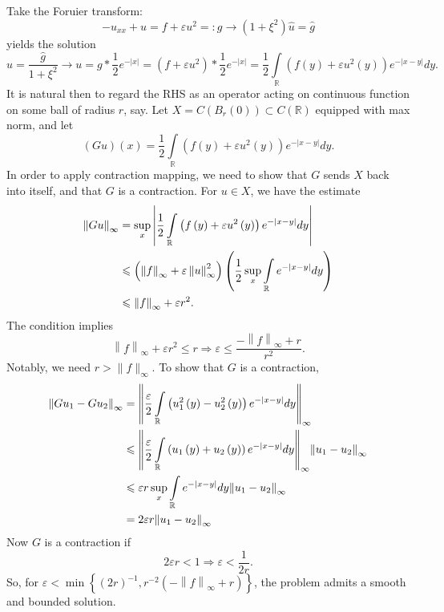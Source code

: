 \documentclass[letterpaper,twoside,11pt]{article}
\theoremstyle{mystyle}
\newcommand{\cblu}{\color{blue}}
\newcommand{\inv}{^{-1}}
\begin{document}
\cblu 
Take the Foruier transform: 
\[ - {u_{xx}} + u = f + \varepsilon {u^2} = :g \longrightarrow \left( {1 + {\xi ^2}} \right)\hat u = \hat g\]
yields the solution 
\[\hat u = \frac{{\hat g}}{{1 + {\xi ^2}}} \longrightarrow u = g * \frac{1}{2}{e^{ - \left| x \right|}} = \left( {f + \varepsilon {u^2}} \right) * \frac{1}{2}{e^{ - \left| x \right|}} = \frac{1}{2}\int\limits_\mathbb{R} {\left( {f\left( y \right) + \varepsilon {u^2}\left( y \right)} \right){e^{ - \left| {x - y} \right|}}dy} .\]
It is natural then to regard the RHS as an operator acting on continuous function on some ball of radius $r$, say. 
Let $X = C\left( {{B_r}\left( 0 \right)} \right) \subset C\left( \mathbb{R} \right)$ equipped with max norm, and let 
\[\left( {Gu} \right)\left( x \right) = \frac{1}{2}\int\limits_\mathbb{R} {\left( {f\left( y \right) + \varepsilon {u^2}\left( y \right)} \right){e^{ - \left| {x - y} \right|}}dy} .\]
In order to apply contraction mapping, we need to show that $G$ sends $X$ back into itself, and that $G$ is a contraction. For $u \in X$, we have the estimate 
\begin{align*}
    {\left\| {Gu} \right\|_\infty } &= \mathop {\sup }\limits_x \left| {\frac{1}{2}\int\limits_\mathbb{R} {\left( {f\left( y \right) + \varepsilon {u^2}\left( y \right)} \right){e^{ - \left| {x - y} \right|}}dy} } \right| \hfill \\
     &\leqslant \left( {{{\left\| f \right\|}_\infty } + \varepsilon \left\| u \right\|_\infty ^2} \right)\left( {\frac{1}{2}\mathop {\sup }\limits_x \int\limits_\mathbb{R} {{e^{ - \left| {x - y} \right|}}dy} } \right) \hfill \\
     &\leqslant {\left\| f \right\|_\infty } + \varepsilon {r^2}.
\end{align*}
The condition implies 
\[{\left\| f \right\|_\infty } + \varepsilon {r^2} \leqslant r \Rightarrow \varepsilon  \leqslant \frac{{ - {{\left\| f \right\|}_\infty } + r}}{{{r^2}}}.\]
Notably, we need $r > \|f\|_{\infty}$. 
To show that $G$ is a contraction, 
\begin{align*}
    {\left\| {G{u_1} - G{u_2}} \right\|_\infty } &= {\left\| {\frac{\varepsilon }{2}\int\limits_\mathbb{R} {\left( {u_1^2\left( y \right) - u_2^2\left( y \right)} \right){e^{ - \left| {x - y} \right|}}dy} } \right\|_\infty } \hfill \\
     &\leqslant {\left\| {\frac{\varepsilon }{2}\int\limits_\mathbb{R} {\left( {{u_1}\left( y \right) + {u_2}\left( y \right)} \right){e^{ - \left| {x - y} \right|}}dy} } \right\|_\infty }{\left\| {{u_1} - {u_2}} \right\|_\infty } \hfill \\
     &\leqslant \varepsilon r\mathop {\sup }\limits_x \int\limits_\mathbb{R} {{e^{ - \left| {x - y} \right|}}dy} {\left\| {{u_1} - {u_2}} \right\|_\infty } \hfill \\
     &= 2\varepsilon r{\left\| {{u_1} - {u_2}} \right\|_\infty } 
\end{align*}
Now $G$ is a contraction if 
\[2\varepsilon r < 1 \Rightarrow \varepsilon  < \frac{1}{{2r}}.\]
So, for $\varepsilon < \min \left\{ (2r)\inv, r^{-2}({ - {{\left\| f \right\|}_\infty } + r}) \right\}$, the problem admits a smooth and bounded solution. 
\end{document}
